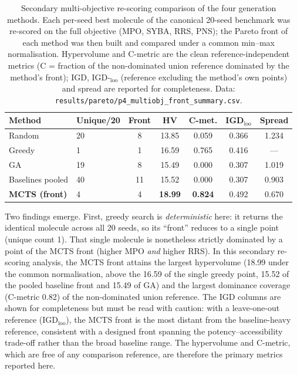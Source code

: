 \documentclass[10pt,a4paper]{article}
\begin{document}
\begin{table}[htbp]
  \centering
  \caption{Secondary multi-objective re-scoring comparison of the four generation methods. Each per-seed best molecule of the canonical \num{20}-seed benchmark was re-scored on the full objective (MPO, SYBA, RRS, PNS); the Pareto front of each method was then built and compared under a common min--max normalisation. Hypervolume and C-metric are the clean reference-independent metrics (C = fraction of the non-dominated union reference dominated by the method's front); IGD, IGD-${}_{\mathrm{loo}}$ (reference excluding the method's own points) and spread are reported for completeness. Data: \texttt{results/pareto/p4\_multiobj\_front\_summary.csv}.}
  \label{tab:front_comp}
  \begin{tabular}{llccccc}
    \toprule
    Method & Unique/20 & Front & HV & C-met. & IGD${}_{\mathrm{loo}}$ & Spread \\
    \midrule
    Random   & \num{20} & \num{8}  & \num{13.85} & \num{0.059} & \num{0.366} & \num{1.234} \\
    Greedy   & \num{1}  & \num{1}  & \num{16.59} & \num{0.765} & \num{0.416} & --- \\
    GA       & \num{19} & \num{8}  & \num{15.49} & \num{0.000} & \num{0.307} & \num{1.019} \\
    Baselines pooled & \num{40} & \num{11} & \num{15.52} & \num{0.000} & \num{0.307} & \num{0.903} \\
    \textbf{MCTS (front)} & \num{4} & \num{4} & \textbf{\num{18.99}} & \textbf{\num{0.824}} & \num{0.492} & \num{0.670} \\
    \bottomrule
  \end{tabular}
\end{table}

Two findings emerge. First, greedy search is \emph{deterministic} here: it returns the identical molecule across all \num{20} seeds, so its ``front'' reduces to a single point (unique count \num{1}). That single molecule is nonetheless strictly dominated by a point of the MCTS front (higher MPO \emph{and} higher RRS). In this secondary re-scoring analysis, the MCTS front attains the largest hypervolume (\num{18.99} under the common normalisation, above the \num{16.59} of the single greedy point, \num{15.52} of the pooled baseline front and \num{15.49} of GA) and the largest dominance coverage (C-metric \num{0.82}) of the non-dominated union reference. The IGD columns are shown for completeness but must be read with caution: with a leave-one-out reference (IGD${}_{\mathrm{loo}}$), the MCTS front is the most distant from the baseline-heavy reference, consistent with a designed front spanning the potency--accessibility trade-off rather than the broad baseline range. The hypervolume and C-metric, which are free of any comparison reference, are therefore the primary metrics reported here.
\end{document}
